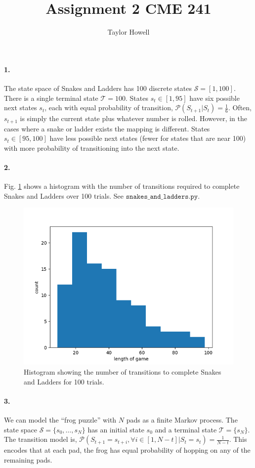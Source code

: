\documentclass[12pt]{article}
\title{Assignment 2 CME 241}
\author{Taylor Howell}
\begin{document}
\maketitle

\paragraph{1.}
The state space of Snakes and Ladders has 100 discrete states $\mathcal{S} = [1, 100]$. There is a single terminal state $\mathcal{T} = 100$. States $s_t \in [1, 95]$ have six possible next states $s_t$, each with equal probability of transition, $\mathcal{P}(S_{t+1} | S_t) = \frac{1}{6}$. Often, $s_{t+1}$ is simply the current state plus whatever number is rolled. However, in the cases where a snake or ladder exists the mapping is different. States $s_t \in [95, 100]$ have less possible next states (fewer for states that are near 100) with more probability of transitioning into the next state.

\paragraph{2.}
Fig. \ref{snakes_and_ladders} shows a histogram with the number of transitions required to complete Snakes and Ladders over 100 trials. See $\texttt{snakes\_and\_ladders.py}$. 
\begin{figure}[h]
	\centering
	\includegraphics[width=.5\textwidth]{snakes_and_ladders_length_histogram.png}
	\caption{Histogram showing the number of transitions to complete Snakes and Ladders for 100 trials.}
	\label{snakes_and_ladders}
\end{figure}

\paragraph{3.}
We can model the ``frog puzzle'' with $N$ pads as a finite Markov process. The state space $\mathcal{S} = \{s_0,\dots,s_{N}\}$ has an initial state $s_0$ and a terminal state $\mathcal{T} = \{s_{N}\}$. The transition model is, $\mathcal{P}(S_{t+1} = s_{t+i}, \forall i \in [1, N-t] | S_t = s_t) = \frac{1}{N - t}$. This encodes that at each pad, the frog has equal probability of hopping on any of the remaining pads.
\end{document}

